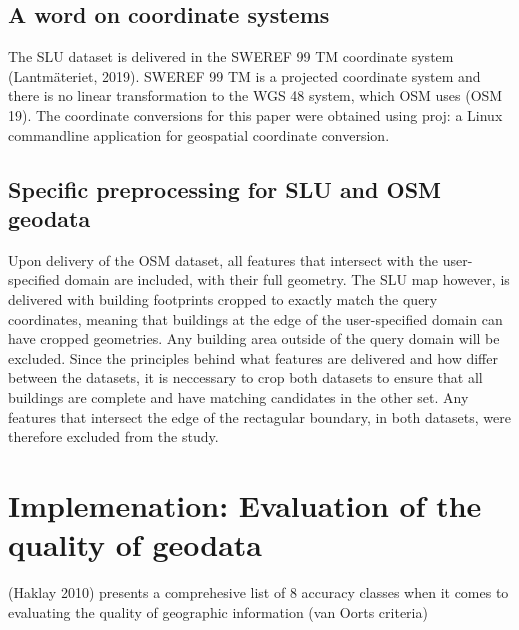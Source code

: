 \documentclass[a4paper]{article}
\begin{document}
\subsection{A word on coordinate systems}

The SLU dataset is delivered in the SWEREF 99 TM coordinate system (Lantmäteriet, 2019). SWEREF 99 TM is a projected coordinate system and there is no linear transformation to the WGS 48 system, which OSM uses (OSM 19). The coordinate conversions for this paper were obtained using proj: a Linux commandline application for geospatial coordinate conversion.

\subsection{Specific preprocessing for SLU and OSM geodata}

Upon delivery of the OSM dataset, all features that intersect with the user-specified domain are included, with their full geometry.
The SLU map however, is delivered with building footprints cropped to exactly match the query coordinates, meaning that buildings at the edge of the user-specified domain can have cropped geometries.
Any building area outside of the query domain will be excluded.
Since the principles behind what features are delivered and how differ between the datasets, it is neccessary to crop both datasets to ensure that all buildings are complete and have matching candidates in the other set.
Any features that intersect the edge of the rectagular boundary, in both datasets, were therefore excluded from the study.

\section{Implemenation: Evaluation of the quality of geodata}

(Haklay 2010) presents a comprehesive list of 8 accuracy classes when it comes to evaluating the quality of geographic information (van Oorts criteria)
\end{document}
